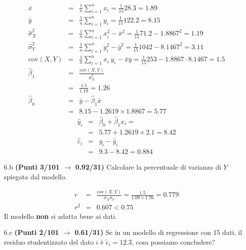 \documentclass[
  11pt,
]{book}
\theoremstyle{mytheoremstyle}
\theoremstyle{mydefstyle}
\newenvironment{sol}
  {
  \begin{tcolorbox}[enhanced,breakable,arc=0.1mm,boxrule=1pt,colback=white,colframe=iblue,
  title=\bf \fontfamily{lmss}\selectfont \hspace{.5 cm} Soluzione,drop fuzzy shadow]

}{
\end{tcolorbox}
  }
\begin{document}
\begin{sol}
\begin{eqnarray*}
           \bar x &=&\frac 1 n\sum_{i=1}^n x_i = \frac {1}{ 15 }  28.3 =  1.89 \\
           \bar y &=&\frac 1 n\sum_{i=1}^n y_i = \frac {1}{ 15 }  122.2 =  8.15 \\
           \hat\sigma_X^2&=&\frac 1 n\sum_{i=1}^n x_i^2-\bar x^2=\frac {1}{ 15 }  71.2  - 1.8867 ^2= 1.19 \\
           \hat\sigma_Y^2&=&\frac 1 n\sum_{i=1}^n y_i^2-\bar y^2=\frac {1}{ 15 }  1042  - 8.1467 ^2= 3.11 \\
           \text{cov}(X,Y)&=&\frac 1 n\sum_{i=1}^n x_i~y_i-\bar x\bar y=\frac {1}{ 15 }  253 - 1.8867 \cdot 8.1467 = 1.5 \\
           \hat\beta_1 &=& \frac{\text{cov}(X,Y)}{\hat\sigma_X^2} \\
                    &=& \frac{ 1.5 }{ 1.19 }  =  1.26 \\
           \hat\beta_0 &=& \bar y - \hat\beta_1 \bar x\\
                    &=&  8.15 - 1.2619 \times  1.8867 = 5.77 
         \end{eqnarray*}\begin{eqnarray*}
\hat y_i &=&\hat\beta_0+\hat\beta_1 x_i=\\ 
&=& 5.77 + 1.2619 \times 2.1 = 8.42 \\ 
\hat \varepsilon_i &=& y_i-\hat y_i\\ 
&=& 9.3 - 8.42 = 0.884  
\end{eqnarray*}

\end{sol}

6.b \textbf{(Punti 3/101 \(\rightarrow\) 0.92/31)} Calcolare la percentuale di varianza di \(Y\) spiegata dal modello.

\begin{sol}
\begin{eqnarray*}
r&=&\frac{\text{cov}(X,Y)}{\sigma_X\sigma_Y}=\frac{ 1.5 }{ 1.09 \times 1.76 }= 0.779 \\r^2&=& 0.607 < 0.75
\end{eqnarray*}
Il modello \textbf{non} si adatta bene ai dati.

\end{sol}

6.c \textbf{(Punti 2/101 \(\rightarrow\) 0.61/31)} Se in un modello di regressione con 15 dati,
il residuo studentizzato del dato \(i\) è \(\tilde \epsilon_i=12.3\), cosa possiamo concludere?
\end{document}
